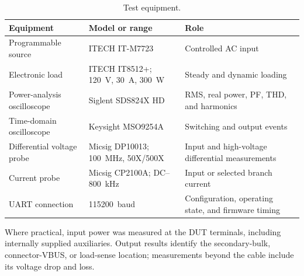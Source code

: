 \begin{table}[htbp]
\centering
\caption{Test equipment.}
\label{tab:bench-equipment}
\small
\begin{tabularx}{\textwidth}{@{}p{}p{}X@{}}
\toprule
Equipment & Model or range & Role\\
\midrule
Programmable source & ITECH IT-M7723 & Controlled AC input\\
Electronic load & ITECH IT8512+; \SI{120}{\volt}, \SI{30}{\ampere}, \SI{300}{\watt} & Steady and dynamic loading\\
Power-analysis oscilloscope & Siglent SDS824X HD & RMS, real power, PF, THD, and harmonics\\
Time-domain oscilloscope & Keysight MSO9254A & Switching and output events\\
Differential voltage probe & Micsig DP10013; \SI{100}{\mega\hertz}, 50X/500X & Input and high-voltage differential measurements\\
Current probe & Micsig CP2100A; DC--\SI{800}{\kilo\hertz} & Input or selected branch current\\
UART connection & \SI{115200}{baud} & Configuration, operating state, and firmware timing\\
\bottomrule
\end{tabularx}
\end{table}

Where practical, input power was measured at the DUT terminals, including
internally supplied auxiliaries. Output results identify the secondary-bulk,
connector-VBUS, or load-sense location; measurements beyond the cable include
its voltage drop and loss.

